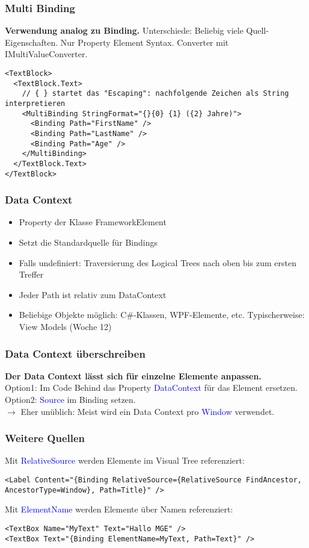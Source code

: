 \subsubsection{Multi Binding}
\textbf{Verwendung analog zu Binding.} Unterschiede: Beliebig viele Quell-Eigenschaften. Nur Property Element Syntax. Converter mit IMultiValueConverter.
\begin{lstlisting}
<TextBlock>
  <TextBlock.Text>
    // { } startet das "Escaping": nachfolgende Zeichen als String interpretieren
    <MultiBinding StringFormat="{}{0} {1} ({2} Jahre)">
      <Binding Path="FirstName" />
      <Binding Path="LastName" />
      <Binding Path="Age" />
    </MultiBinding>
  </TextBlock.Text>
</TextBlock>
\end{lstlisting}
\subsubsection{Data Context}
\begin{itemize}[topsep=0pt, leftmargin=4mm]
    \setlength\itemsep{-0.3em}
    \item Property der Klasse FrameworkElement
    \item Setzt die Standardquelle für Bindings
    \item Falls undefiniert: Traversierung des Logical Trees nach oben bis zum ersten Treffer
    \item Jeder Path ist relativ zum DataContext
    \item Beliebige Objekte möglich: C\#-Klassen, WPF-Elemente, etc. Typischerweise: View Models (Woche 12)
\end{itemize}
\subsubsection{Data Context überschreiben}
\textbf{Der Data Context lässt sich für einzelne Elemente anpassen.}\\
Option1: Im Code Behind das Property \textcolor{blue}{DataContext} für das Element ersetzen. Option2: \textcolor{blue}{Source} im Binding setzen.\\
$\rightarrow$ Eher unüblich: Meist wird ein Data Context pro \textcolor{blue}{Window} verwendet.
\subsubsection{Weitere Quellen}
Mit \textcolor{blue}{RelativeSource} werden Elemente im Visual Tree referenziert:
\begin{lstlisting}
<Label Content="{Binding RelativeSource={RelativeSource FindAncestor, AncestorType=Window}, Path=Title}" />
\end{lstlisting}
Mit \textcolor{blue}{ElementName} werden Elemente über Namen referenziert:
\begin{lstlisting}
<TextBox Name="MyText" Text="Hallo MGE" />
<TextBox Text="{Binding ElementName=MyText, Path=Text}" />
\end{lstlisting}
